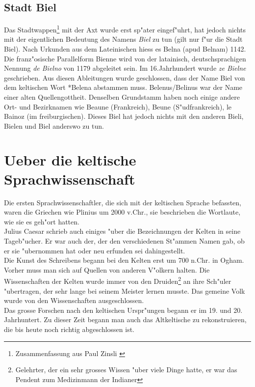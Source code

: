 \documentclass[10pt]{article}
\begin{document}
\subsection{Stadt Biel}
Das Stadtwappen\footnote{Zusammenfassung aus Paul Zinsli \cite{ON:ZINSLI}} mit der Axt wurde erst sp"ater eingef"uhrt, hat jedoch
nichts mit der eigentlichen Bedeutung des Namens {\sl Biel} zu tun (gilt nur
f"ur die Stadt Biel). Nach Urkunden aus dem Lateinischen hiess es Belna 
(apud Belnam) 1142. Die franz"osische Parallelform Bienne wird von der
latainisch, deutschsprachigen Nennung {\sl de Bielno} von 1179 abgeleitet sein.
Im 16.Jahrhundert wurde {\sl ze Bielne} geschrieben. Aus diesen Ableitungen
wurde geschlossen, dass der Name Biel von dem keltischen Wort *Belena
abstammen muss.
Belenus/Belinus war der Name einer alten Quellengottheit. Denselben
Grundstamm haben noch einige andere Ort- und Bezirknamen wie
Beaune (Frankreich), Beune (S"udfrankreich), le Bainoz (im freiburgischen).
Dieses Biel hat jedoch nichts mit den anderen Bieli, Bielen und Biel
anderswo zu tun.

\section{Ueber die keltische Sprachwissenschaft} \label{Wissen}
Die ersten Sprachwissenschaftler, die sich mit der keltischen Sprache befassten,
waren die Griechen wie Plinius um 2000 v.Chr., sie beschrieben die
Wortlaute, wie sie es geh"ort hatten.\\
Julius Caesar schrieb auch einiges "uber die Bezeichnungen der Kelten in seine
Tageb"ucher. Er war auch der, der den verschiedenen St"ammen Namen gab, ob
er sie "ubernommen hat oder neu erfunden sei dahingestellt.\\
Die Kunst des Schreibens begann bei den Kelten erst um 700 n.Chr. in Ogham.
Vorher muss man sich auf Quellen von anderen V"olkern halten. Die Wissenschaften
der Kelten wurde immer von den Druiden\footnote{Gelehrter, der ein sehr grosses
Wissen "uber viele Dinge hatte, er war das Pendent zum Medizinmann der Indianer}
an ihre Sch"uler "ubertragen, der sehr lange
bei seinem Meister lernen musste. Das gemeine Volk wurde von den Wissenschaften
ausgeschlossen.\\
Das grosse Forschen nach den keltischen Urspr"ungen begann er im 19. und 20.
Jahrhuntert. Zu dieser Zeit begann man auch das Altkeltische zu rekonstruieren,
die bis heute noch richtig abgeschlossen ist.
\end{document}
